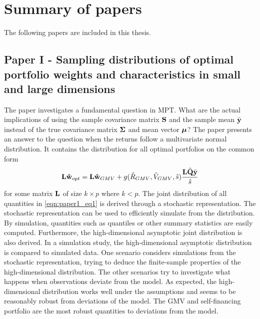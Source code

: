 \documentclass[12pt, twoside]{book}\usepackage{knitr}
\begin{document}
\chapter{Summary of papers}\label{ch:papersummary}


The following papers are included in this thesis.
\section{Paper I - Sampling distributions of optimal portfolio weights and characteristics in small and large dimensions}\label{sec:paper1}
The paper investigates a fundamental question in MPT. 
What are the actual implications of using the sample covariance matrix $\mathbf{S}$ and the sample mean $\bar{\mathbf{y}}$ instead of the true covariance matrix $\mathbf{\Sigma}$ and mean vector $\mbox{\boldmath$\mu$}$?
The paper presents an answer to the question when the returns follow a multivariate normal distribution. 
It contains the distribution for all optimal portfolios on the common form
\begin{equation}\label{eqn:paper1_eq1}
  \mathbf{L}\mathbf{\hat{w}}_{opt} = \mathbf{L}\mathbf{\hat{w}}_{GMV} + g(\hat{R}_{GMV}, \hat{V}_{GMV}, \hat{s})\frac{\mathbf{L}\hat{\mathbf{Q}}\bar{\mathbf{y}}}{\hat{s}}
\end{equation}
for some matrix $\mathbf{L}$ of size $k \times p$ where $k<p$.
The joint distribution of all quantities in \eqref{eqn:paper1_eq1} is derived through a stochastic representation. 
The stochastic representation can be used to efficiently simulate from the distribution.
By simulation, quantities such as quantiles or other summary statistics are easily computed.
Furthermore, the high-dimensional asymptotic joint distribution is also derived. 
In a simulation study, the high-dimensional asymptotic distribution is compared to simulated data.
One scenario considers simulations from the stochastic representation, trying to deduce the finite-sample properties of the high-dimensional distribution.
The other scenarios try to investigate what happens when observations deviate from the model.
As expected, the high-dimensional distribution works well under the assumptions and seems to be reasonably robust from deviations of the model.
The GMV and self-financing portfolio are the most robust quantities to deviations from the model.
\end{document}
